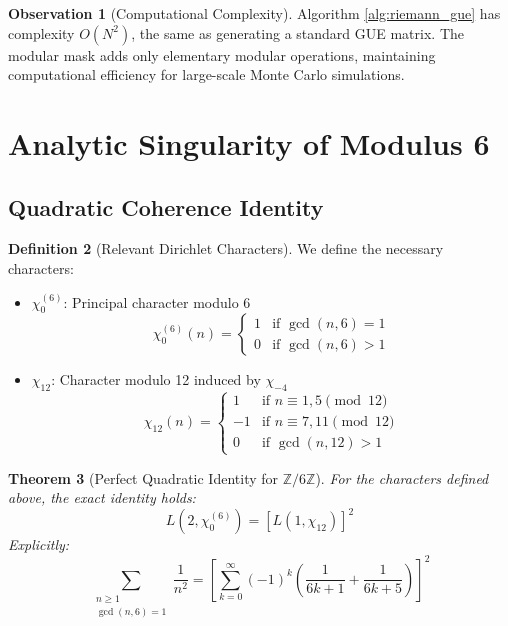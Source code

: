 \documentclass[12pt, a4paper]{article}
\theoremstyle{plain}
\newtheorem{teorema}{Theorem}[section]
\theoremstyle{definition}
\newtheorem{definicion}[teorema]{Definition}
\newtheorem{observacion}[teorema]{Observation}
\theoremstyle{remark}
\begin{document}
\begin{observacion}[Computational Complexity]
Algorithm \ref{alg:riemann_gue} has complexity $O(N^2)$, the same as generating a standard GUE matrix. The modular mask adds only elementary modular operations, maintaining computational efficiency for large-scale Monte Carlo simulations.
\end{observacion}

\section{Analytic Singularity of Modulus 6}
\label{sec:singularidad_modulo6}

\subsection{Quadratic Coherence Identity}
\label{subsec:identidad_cuadratica}

\begin{definicion}[Relevant Dirichlet Characters]
We define the necessary characters:
\begin{itemize}
    \item $\chi_0^{(6)}$: Principal character modulo 6
    \[
    \chi_0^{(6)}(n) = \begin{cases} 
    1 & \text{if } \gcd(n,6)=1 \\
    0 & \text{if } \gcd(n,6)>1 
    \end{cases}
    \]
    
    \item $\chi_{12}$: Character modulo 12 induced by $\chi_{-4}$
    \[
    \chi_{12}(n) = \begin{cases}
    1 & \text{if } n \equiv 1, 5 \pmod{12} \\
    -1 & \text{if } n \equiv 7, 11 \pmod{12} \\
    0 & \text{if } \gcd(n,12)>1
    \end{cases}
    \]
\end{itemize}
\end{definicion}

\begin{teorema}[Perfect Quadratic Identity for $\mathbb{Z}/6\mathbb{Z}$]
\label{teo:identidad_cuadratica}
For the characters defined above, the exact identity holds:
\[
L(2,\chi_0^{(6)}) = [L(1,\chi_{12})]^2
\]
Explicitly:
\[
\sum_{\substack{n \geq 1 \\ \gcd(n,6)=1}} \frac{1}{n^2} = \left[ \sum_{k=0}^\infty (-1)^k \left( \frac{1}{6k+1} + \frac{1}{6k+5} \right) \right]^2
\]
\end{teorema}
\end{document}
